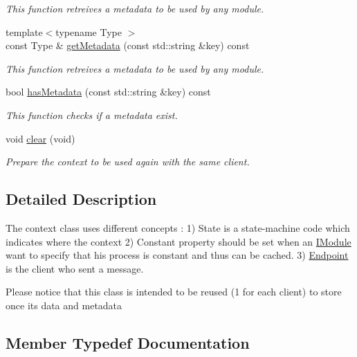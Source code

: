 \begin{DoxyCompactItemize}
\begin{DoxyCompactList}\small\item\em This function retreives a metadata to be used by any module. \end{DoxyCompactList}\item 
{\footnotesize template$<$typename Type $>$ }\\const Type \& \mbox{\hyperlink{classo_z_1_1_context_adc8893fcfcca33f84ad1f14dd41b62ec}{get\+Metadata}} (const std\+::string \&key) const
\begin{DoxyCompactList}\small\item\em This function retreives a metadata to be used by any module. \end{DoxyCompactList}\item 
bool \mbox{\hyperlink{classo_z_1_1_context_aac0bec30406ebdb0f41d286d9b42a2ec}{has\+Metadata}} (const std\+::string \&key) const
\begin{DoxyCompactList}\small\item\em This function checks if a metadata exist. \end{DoxyCompactList}\item 
void \mbox{\hyperlink{classo_z_1_1_context_ade0f49a6468ea81eec1e97ace81b926e}{clear}} (void)
\begin{DoxyCompactList}\small\item\em Prepare the context to be used again with the same client. \end{DoxyCompactList}\end{DoxyCompactItemize}


\subsection{Detailed Description}
The context class uses different concepts \+: 1) State is a state-\/machine code which indicates where the context 2) Constant property should be set when an \mbox{\hyperlink{classo_z_1_1_i_module}{I\+Module}} want to specify that his process is constant and thus can be cached. 3) \mbox{\hyperlink{classo_z_1_1_endpoint}{Endpoint}} is the client who sent a message. 

Please notice that this class is intended to be reused (1 for each client) to store once its data and metadata 

\subsection{Member Typedef Documentation}
\mbox{\label{classo_z_1_1_context_a27f05cdc375f513979a6080896cf9496}} 
